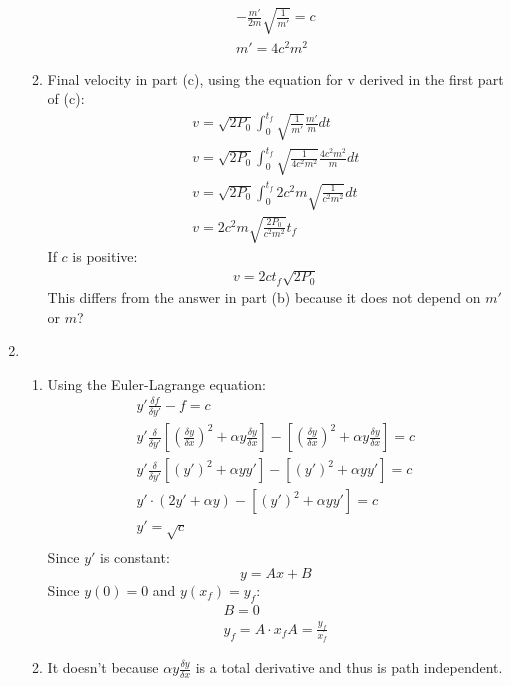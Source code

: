 \documentclass[12pt]{article}
\begin{document}
\begin{enumerate}
\begin{enumerate}
\begin{gather*}
                -\frac{m'}{2m}\sqrt{\frac{1}{m'}}=c\\
                m'=4c^2 m^2
            \end{gather*}
            \item
            Final velocity in part (c), using the equation for v derived in the first part of (c):
            \begin{gather*}
                v=\sqrt{2P_0}\int_0^{t_f}\sqrt{\frac{1}{m'}}\frac{m'}{m}dt\\
                v=\sqrt{2P_0}\int_0^{t_f}\sqrt{\frac{1}{4c^2 m^2}}\frac{4c^2 m^2}{m}dt\\
                v=\sqrt{2P_0}\int_0^{t_f}2 c^2 m \sqrt{\frac{1}{c^2 m^2}}dt\\
                v=2c^2 m\sqrt{\frac{2P_0}{c^2 m^2}}t_f
            \end{gather*}
            If $c$ is positive:
            \begin{gather*}
                v=2ct_f\sqrt{2P_0}
            \end{gather*}
            This differs from the answer in part (b) because it does not depend on $m'$ or $m$?
        \end{enumerate}
        \item
        \begin{enumerate}
            \item
            Using the Euler-Lagrange equation:
            \begin{gather*}
                y'\frac{\delta f}{\delta y'}-f=c\\
                y'\frac{\delta}{\delta y'}\left[\left(\frac{\delta y}{\delta x}\right)^2+\alpha y\frac{\delta y}{\delta x}\right]-\left[\left(\frac{\delta y}{\delta x}\right)^2+\alpha y\frac{\delta y}{\delta x}\right]=c\\
                y'\frac{\delta}{\delta y'}\left[\left(y'\right)^2+\alpha yy'\right]-\left[\left(y'\right)^2+\alpha yy'\right]=c\\
                y'\cdot\left(2y'+\alpha y\right)-\left[\left(y'\right)^2+\alpha yy'\right]=c\\
                y'=\sqrt{c}\\
            \end{gather*}
            Since $y'$ is constant:
            \[
                y=Ax+B
            \]
            Since $y(0)=0$ and $y(x_f)=y_f$:
            \begin{gather*}
                B=0\\
                y_f=A\cdot x_f
                A=\frac{y_f}{x_f}
            \end{gather*}
            \item It doesn't because $\alpha y\frac{\delta y}{\delta x}$ is a total derivative and thus is path independent.


\end{enumerate}
\end{enumerate}
\end{document}
